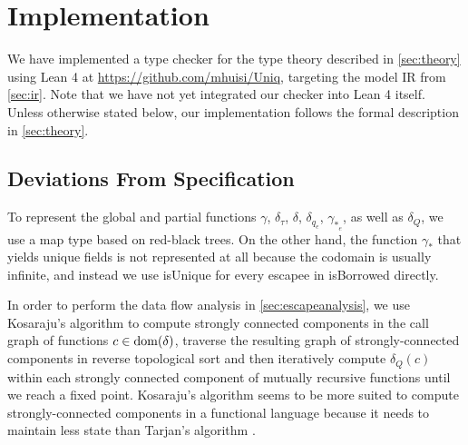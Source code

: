 \chapter{Implementation}\label{sec:implementation}

We have implemented a type checker for the type theory described in \cref{sec:theory} using Lean 4 at \url{https://github.com/mhuisi/Uniq}, targeting the model IR from \cref{sec:ir}. Note that we have not yet integrated our checker into Lean 4 itself. Unless otherwise stated below, our implementation follows the formal description in \cref{sec:theory}.

\section{Deviations From Specification}

To represent the global and partial functions $\gamma$, $\delta_\tau$, $\delta$, $\delta_{q_e}$, $\gamma_{*_e}$, as well as $\delta_Q$, we use a map type based on red-black trees. On the other hand, the function $\gamma_*$ that yields unique fields is not represented at all because the codomain is usually infinite, and instead we use isUnique for every escapee in isBorrowed directly.

In order to perform the data flow analysis in \cref{sec:escapeanalysis}, we use Kosaraju's algorithm \citep{sharir_strong-connectivity_1981} to compute strongly connected components in the call graph of functions $c \in \mathrm{dom}(\delta)$, traverse the resulting graph of strongly-connected components in reverse topological sort and then iteratively compute $\delta_Q(c)$ within each strongly connected component of mutually recursive functions until we reach a fixed point. Kosaraju's algorithm seems to be more suited to compute strongly-connected components in a functional language because it needs to maintain less state than Tarjan's algorithm \citep{tarjan_depth-first_1972}.


